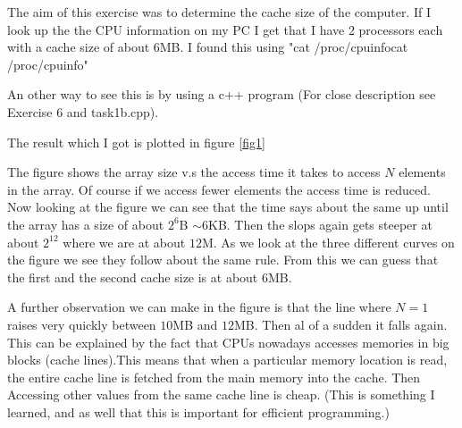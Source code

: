 \documentclass[a4paper,10pt]{article}
\begin{document}
The aim of this exercise was to determine the cache size of the computer. If I look up the the CPU information on my PC I get that I have 2 processors each with a cache size of about $6$MB. I found this using "cat /proc/cpuinfocat /proc/cpuinfo"

An other way to see this is by using a c++ program (For close description see Exercise 6 and  task1b.cpp).

The result which I got is plotted in figure \ref{fig1}

The figure shows the array size v.s the access time it takes to access $N$ elements in the array. Of course if we access fewer elements the access time is reduced. Now looking at the figure we can see that the time says about the same up until the array has a size of about $2^6$B $\sim 6$KB. Then the slops again gets steeper at about $2^12$ where we are at about $12$M.
As we look at the three different curves on the figure we see they follow about the same rule. From this we can guess that the first and the second cache size is at about $6$MB. 


A further observation we can make in the figure is that the line where $N=1$ raises very quickly between $10$MB and $12$MB. Then al of a sudden it falls again. This can be explained by the fact that CPUs nowadays accesses memories in big blocks (cache lines).This means that when a particular memory location is read, the entire cache line is fetched from the main memory into the cache.  Then Accessing other values from the same cache line is cheap. (This is something I learned, and as well that this is important for efficient programming.)
\end{document}
